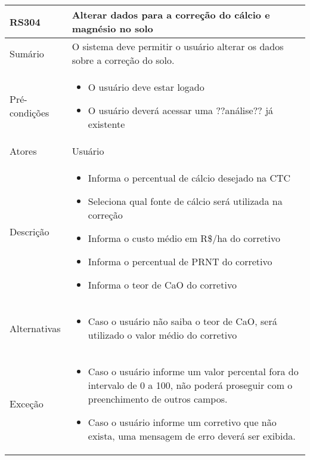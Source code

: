 \begin{quadro}[H]
    \begin{tabular}{|p{3cm}|p{11cm}|}
        \hline
        \textbf{RS304} & \textbf{Alterar dados para a correção do cálcio e magnésio no solo}          \\
        \hline
        Sumário        & O sistema deve permitir o usuário alterar os dados sobre a correção do solo. \\
        \hline
        Pré-condições  & \begin{itemize}
            \item O usuário deve estar logado
            \item O usuário deverá acessar uma ??análise?? já existente
        \end{itemize}                                                   \\
        \hline
        Atores         & Usuário                                                                      \\
        \hline
        Descrição      &
        \begin{itemize}
            \item Informa o percentual de cálcio desejado na CTC
            \item Seleciona qual fonte de cálcio será utilizada na correção
            \item Informa o custo médio em R\$/ha do corretivo
            \item Informa o percentual de PRNT do corretivo
            \item Informa o teor de CaO do corretivo
        \end{itemize}                                                                    \\
        \hline
        Alternativas   &
        \begin{itemize}
            \item Caso o usuário não saiba o teor de CaO, será utilizado o valor médio do corretivo
        \end{itemize}                                                                    \\
        \hline
        Exceção        &
        \begin{itemize}
            \item Caso o usuário informe um valor percental fora do intervalo de 0 a 100, não poderá proseguir com o preenchimento de outros campos.
            \item Caso o usuário informe um corretivo que não exista, uma mensagem de erro deverá ser exibida.
        \end{itemize}                                                                    \\
        \hline
    \end{tabular}
\end{quadro}


